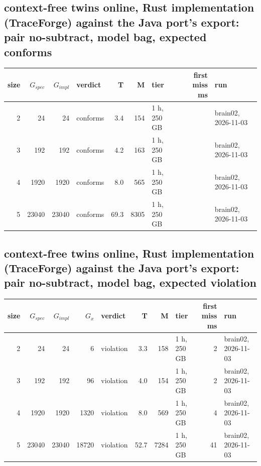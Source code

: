 \documentclass[10pt]{article}
\begin{document}
\subsection*{context-free twins online, Rust implementation (TraceForge) against the Java port's export: pair \textsf{no-subtract}, model bag, expected conforms}
\begin{longtable}{@{}rrrlrrlrl@{}}
\toprule
size & $G_{\mathit{spec}}$ & $G_{\mathit{impl}}$ & verdict & T & M & tier & first miss ms & run \\
\midrule
\endhead
\color{red} 2 & 24 & 24 & conforms & 3.4 & 154 & 1 h, 250 GB &  & brain02, 2026-11-03 \\
\color{red} 3 & 192 & 192 & conforms & 4.2 & 163 & 1 h, 250 GB &  & brain02, 2026-11-03 \\
\color{red} 4 & 1920 & 1920 & conforms & 8.0 & 565 & 1 h, 250 GB &  & brain02, 2026-11-03 \\
\color{red} 5 & 23040 & 23040 & conforms & 69.3 & 8305 & 1 h, 250 GB &  & brain02, 2026-11-03 \\
\bottomrule
\end{longtable}
\subsection*{context-free twins online, Rust implementation (TraceForge) against the Java port's export: pair \textsf{no-subtract}, model bag, expected violation}
\begin{longtable}{@{}rrrrlrrlrl@{}}
\toprule
size & $G_{\mathit{spec}}$ & $G_{\mathit{impl}}$ & $G_x$ & verdict & T & M & tier & first miss ms & run \\
\midrule
\endhead
\color{red} 2 & 24 & 24 & 6 & violation & 3.3 & 158 & 1 h, 250 GB & 2 & brain02, 2026-11-03 \\
\color{red} 3 & 192 & 192 & 96 & violation & 4.0 & 154 & 1 h, 250 GB & 2 & brain02, 2026-11-03 \\
\color{red} 4 & 1920 & 1920 & 1320 & violation & 8.0 & 569 & 1 h, 250 GB & 4 & brain02, 2026-11-03 \\
\color{red} 5 & 23040 & 23040 & 18720 & violation & 52.7 & 7284 & 1 h, 250 GB & 41 & brain02, 2026-11-03 \\
\bottomrule
\end{longtable}
\end{document}
